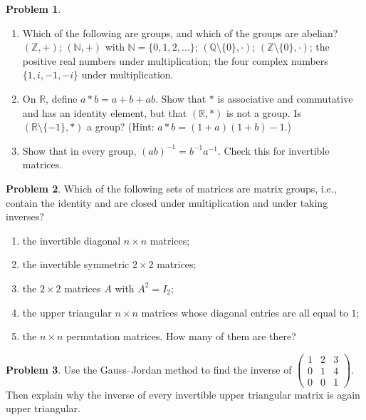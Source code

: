 \documentclass[11pt]{article}
\theoremstyle{definition}
\newtheorem{problem}{Problem}[section]
\begin{document}
\begin{problem}\label{pr:abstract-groups}
    \begin{enumerate}[label=(\alph*)]
        \item Which of the following are groups, and which of the groups are abelian? $(\mathbb{Z}, +)$; $(\mathbb{N}, +)$ with $\mathbb{N} = \{0, 1, 2, \ldots\}$; $(\mathbb{Q} \setminus \{0\}, \cdot)$; $(\mathbb{Z} \setminus \{0\}, \cdot)$; the positive real numbers under multiplication; the four complex numbers $\{1, i, -1, -i\}$ under multiplication.
        \item On $\mathbb{R}$, define $a \ast b = a + b + ab$. Show that $\ast$ is associative and commutative and has an identity element, but that $(\mathbb{R}, \ast)$ is not a group. Is $(\mathbb{R} \setminus \{-1\}, \ast)$ a group? (Hint: $a \ast b = (1 + a)(1 + b) - 1$.)
        \item Show that in every group, $(ab)^{-1} = b^{-1}a^{-1}$. Check this for invertible matrices.
    \end{enumerate}
\end{problem}

\begin{problem}\label{pr:groups}
    Which of the following sets of matrices are matrix groups, i.e., contain the identity and are closed under multiplication and under taking inverses?
    \begin{enumerate}[label=(\alph*)]
        \item the invertible diagonal $n \times n$ matrices;
        \item the invertible symmetric $2 \times 2$ matrices;
        \item the $2 \times 2$ matrices $A$ with $A^2 = I_2$;
        \item the upper triangular $n \times n$ matrices whose diagonal entries are all equal to $1$;
        \item the $n \times n$ permutation matrices. How many of them are there?
    \end{enumerate}
\end{problem}

\begin{problem}\label{pr:inverse-triangular}
    Use the Gauss--Jordan method to find the inverse of $\begin{pmatrix} 1 & 2 & 3 \\ 0 & 1 & 4 \\ 0 & 0 & 1 \end{pmatrix}$. Then explain why the inverse of every invertible upper triangular matrix is again upper triangular.
\end{problem}
\end{document}

